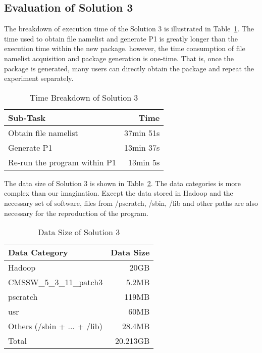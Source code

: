 \documentclass{acm_proc_article-sp}
\begin{document}
\subsection{Evaluation of Solution 3}
The breakdown of execution time of the Solution 3 is illustrated in Table~\ref{table:time-3rd}. The time used to obtain file namelist and generate P1 is greatly longer than the execution time within the new package. however, the time consumption of file namelist acquisition and package generation is one-time. That is, once the package is generated, many users can directly obtain the package and repeat the experiment separately. 

\begin{table}
    \centering
    \begin{tabular}{|l|r|}
    \hline
    Sub-Task & Time \\ \hline
    Obtain file namelist & 37min 51s \\ \hline
    Generate P1 & 13min 37s \\ \hline
    Re-run the program within P1 & 13min 5s \\ \hline
    \end{tabular}
    \caption{Time Breakdown of Solution 3}
    \label{table:time-3rd}
\end{table}

The data size of Solution 3 is shown in Table~\ref{table:datasize-3rd}. The
data categories is more complex than our imagination. Except the data stored in
Hadoop and the necessary set of software, files from /pscratch, /sbin, /lib and other
paths are also necessary for the reproduction of the program.

\begin{table}
    \centering
    \begin{tabular}{|l|r|}
    \hline
    Data Category & Data Size \\ \hline
    Hadoop & 20GB \\ \hline
    CMSSW\_5\_3\_11\_patch3 & 5.2MB \\ \hline
    pscratch & 119MB \\ \hline
    usr & 60MB \\ \hline
    Others (/sbin + ... + /lib) & 28.4MB \\ \hline
    Total & 20.213GB \\ \hline
    \end{tabular}
    \caption{Data Size of Solution 3}
    \label{table:datasize-3rd}
\end{table}    
\end{document}

